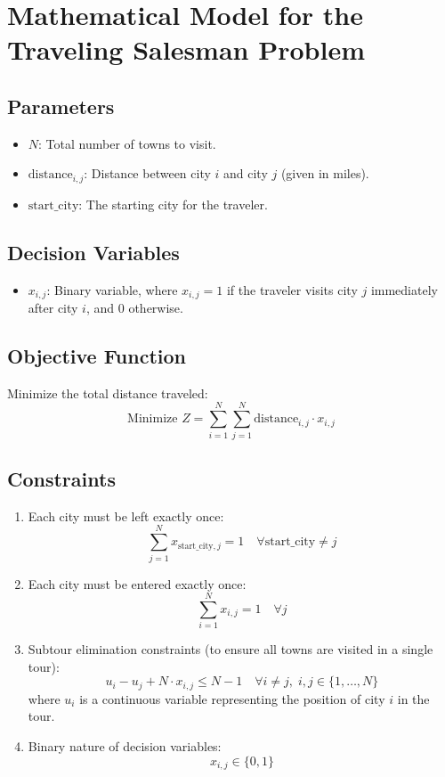 \documentclass{article}
\begin{document}
\section*{Mathematical Model for the Traveling Salesman Problem}

\subsection*{Parameters}
\begin{itemize}
    \item \( N \): Total number of towns to visit.
    \item \( \text{distance}_{i,j} \): Distance between city \( i \) and city \( j \) (given in miles).
    \item \( \text{start\_city} \): The starting city for the traveler.
\end{itemize}

\subsection*{Decision Variables}
\begin{itemize}
    \item \( x_{i,j} \): Binary variable, where \( x_{i,j} = 1 \) if the traveler visits city \( j \) immediately after city \( i \), and \( 0 \) otherwise.
\end{itemize}

\subsection*{Objective Function}
Minimize the total distance traveled:
\[
\text{Minimize } Z = \sum_{i=1}^{N} \sum_{j=1}^{N} \text{distance}_{i,j} \cdot x_{i,j}
\]

\subsection*{Constraints}
\begin{enumerate}
    \item Each city must be left exactly once:
    \[
    \sum_{j=1}^{N} x_{\text{start\_city},j} = 1 \quad \forall \text{start\_city} \neq j
    \]
    
    \item Each city must be entered exactly once:
    \[
    \sum_{i=1}^{N} x_{i,j} = 1 \quad \forall j
    \]
    
    \item Subtour elimination constraints (to ensure all towns are visited in a single tour):
    \[
    u_i - u_j + N \cdot x_{i,j} \leq N-1 \quad \forall i \neq j, \; i,j \in \{1, \ldots, N\}
    \]
    where \( u_i \) is a continuous variable representing the position of city \( i \) in the tour.
    
    \item Binary nature of decision variables:
    \[
    x_{i,j} \in \{0, 1\}
    \]
\end{enumerate}
\end{document}
